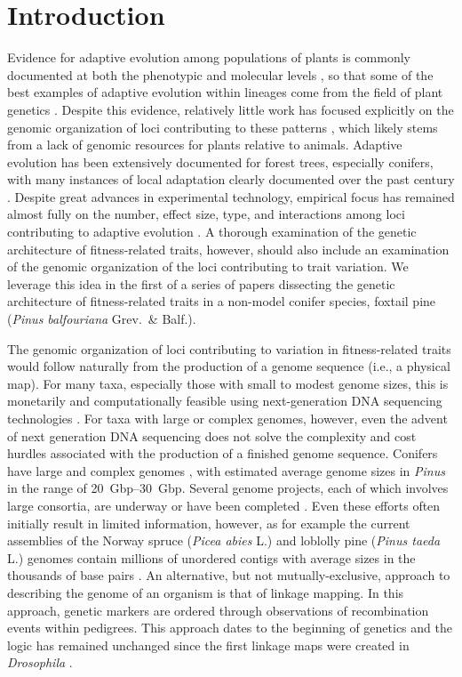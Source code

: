 \documentclass[smallextended]{svjour3}
\begin{document}
\section*{Introduction}

Evidence for adaptive evolution among populations of plants is commonly
documented at both the phenotypic and molecular levels \citep{Kawecki:2004,
  Pannell:2013}, so that some of the best examples of adaptive evolution within
lineages come from the field of plant genetics \citep[e.g.,][]{Antonovics:1970}.
Despite this evidence, relatively little work has focused explicitly on the
genomic organization of loci contributing to these patterns
\citep{Hoffman:2008}, which likely stems from a lack of genomic resources
for plants relative to animals.  Adaptive evolution has been extensively
documented for forest trees, especially conifers, with many instances of local
adaptation clearly documented over the past century \citep{White:2007,
  Neale:2011}. Despite great advances in experimental technology, empirical
focus has remained almost fully on the number, effect size, type, and
interactions among loci contributing to adaptive evolution \citep{Neale:2011,
  Alberto:2013}.  A thorough examination of the genetic architecture of
fitness-related traits, however, should also include an examination of the
genomic organization of the loci contributing to trait variation. We
leverage this idea in the first of a series of papers dissecting the genetic
architecture of fitness-related traits in a non-model conifer species, foxtail
pine (\textit{Pinus balfouriana} Grev.\  \& Balf.).

The genomic organization of loci contributing to variation in
fitness-related traits would follow naturally from the production of a genome
sequence (i.e., a physical map). For many taxa, especially those with small to
modest genome sizes, this is monetarily and computationally feasible using
next-generation DNA sequencing technologies \citep{Koboldt:2013}. For taxa with
large or complex genomes, however, even the advent of next generation DNA
sequencing does not solve the complexity and cost hurdles associated with the
production of a finished genome sequence. Conifers have large and complex
genomes \citep{Murray:1998, Ahuja:2005}, with estimated average genome sizes in
\textit{Pinus} in the range of \SIrange{20}{30}{Gbp}. Several genome projects,
each of which involves large consortia, are underway or have been completed
\citep{Mackay:2012}. Even these efforts often initially result in limited
information, however, as for example the current assemblies of the Norway spruce
(\textit{Picea abies} L.) and loblolly pine (\textit{Pinus taeda} L.) genomes
contain millions of unordered contigs with average sizes in the thousands of
base pairs \citep{Nystedt:2013, Neale:2014}. An alternative, but not
mutually-exclusive, approach to describing the genome of an organism is that of
linkage mapping. In this approach, genetic markers are ordered through
observations of recombination events within pedigrees. This approach dates to
the beginning of genetics and the logic has remained unchanged since
the first linkage maps were created in \textit{Drosophila}
\citep{Sturtevant:1913}.
\end{document}

